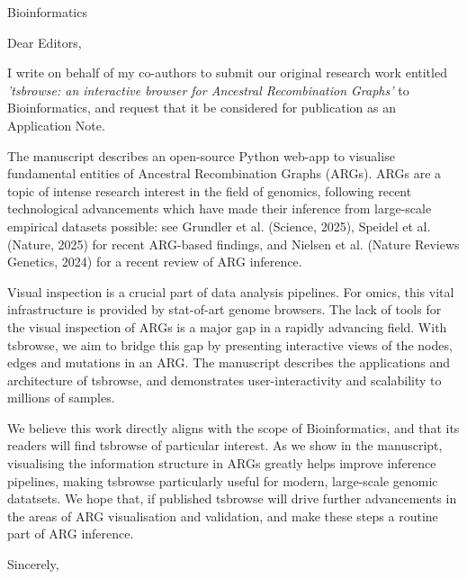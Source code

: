\documentclass{letter}
\begin{document}
\begin{letter}{Bioinformatics}

    \opening{Dear Editors,}

    I write on behalf of my co-authors to submit our original research work
    entitled
    \emph{'tsbrowse: an interactive browser for Ancestral Recombination
        Graphs'} to
    Bioinformatics,
    and request that it be considered for publication as an Application Note.

    The manuscript describes an open-source Python web-app to visualise
    fundamental
    entities
    of Ancestral Recombination Graphs (ARGs). ARGs are a topic of intense
    research
    interest in the field of genomics, following recent technological
    advancements
    which have made their inference from large-scale empirical datasets
    possible: see Grundler et al. (Science, 2025), Speidel et al. (Nature,
    2025)
    for recent ARG-based findings, and Nielsen et al. (Nature Reviews Genetics,
    2024) for a recent review of ARG inference.
    
    Visual inspection is a crucial part of data analysis pipelines. For omics,
    this
    vital
    infrastructure is provided by stat-of-art genome browsers. The lack of
    tools
    for the
    visual inspection of ARGs is a major gap in a rapidly advancing field. With
    tsbrowse,
    we aim to bridge this gap by presenting interactive views of the nodes,
    edges
    and mutations
    in an ARG. The manuscript describes the applications and architecture of
    tsbrowse, and
    demonstrates user-interactivity and scalability to millions of samples.

    We believe this work directly aligns with the scope of Bioinformatics, and
    that
    its
    readers will find tsbrowse of particular interest. As we show in the
    manuscript, visualising
    the information structure in ARGs greatly helps improve inference
    pipelines,
    making tsbrowse
    particularly useful for modern, large-scale genomic datatsets. We hope
    that, if
    published
    tsbrowse will drive further advancements in the areas of ARG visualisation
    and
    validation,
    and make these steps a routine part of ARG inference.

    \closing{Sincerely,}

\end{letter}
\end{document}
